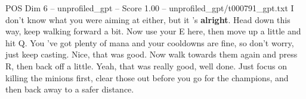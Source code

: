\begin{textsample}{POS Dim 6 – unprofiled\_gpt – Score 1.00 – unprofiled\_gpt/t000791\_gpt.txt}  \label{ex:f6_pos_028}
I don't know what you were aiming at either, but it ’s \textbf{alright}.
Head down this way, keep walking forward a bit.
Now use your E here, then move up a little and hit Q.
You ’ve got plenty of mana and your cooldowns are fine, so don't worry, just keep casting.
Nice, that was good.
Now walk towards them again and press R, then back off a little.
Yeah, that was really good, well done.
Just focus on killing the minions first, clear those out before you go for the champions, and then back away to a safer distance.

\end{textsample}
